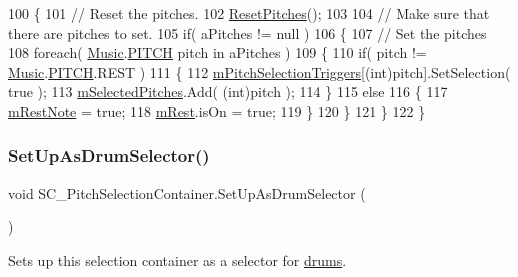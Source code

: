 \begin{DoxyCode}
100     \{
101         \textcolor{comment}{// Reset the pitches.}
102         \hyperlink{group___s_c___p_s_c_pub_func_ga678ef561c5418e4bf43a5f9ed753f0f0}{ResetPitches}();
103 
104         \textcolor{comment}{// Make sure that there are pitches to set.}
105         \textcolor{keywordflow}{if}( aPitches != null )
106         \{
107             \textcolor{comment}{// Set the pitches}
108             \textcolor{keywordflow}{foreach}( \hyperlink{class_music}{Music}.\hyperlink{group___music_enums_ga508f69b199ea518f935486c990edac1d}{PITCH} pitch in aPitches )
109             \{
110                 \textcolor{keywordflow}{if}( pitch != \hyperlink{class_music}{Music}.\hyperlink{group___music_enums_ga508f69b199ea518f935486c990edac1d}{PITCH}.REST )
111                 \{
112                     \hyperlink{group___s_c___p_s_c_priv_var_ga8431846d376b98bc6de5a872cce2c596}{mPitchSelectionTriggers}[(int)pitch].SetSelection( \textcolor{keyword}{true} );
113                     \hyperlink{group___s_c___p_s_c_priv_var_ga5a8a5c31158f6af7f0c17d4fd03c5641}{mSelectedPitches}.Add( (\textcolor{keywordtype}{int})pitch );
114                 \}
115                 \textcolor{keywordflow}{else}
116                 \{
117                     \hyperlink{group___s_c___p_s_c_priv_var_ga6eec175f775c35e2d0eb51dfe6def49f}{mRestNote} = \textcolor{keyword}{true};
118                     \hyperlink{group___s_c___p_s_c_priv_var_gae4378d4e0b53501eb0f55b8af38a5a8c}{mRest}.isOn = \textcolor{keyword}{true};
119                 \}
120             \}
121         \}
122     \}
\end{DoxyCode}
\mbox{\label{group___s_c___p_s_c_pub_func_ga08a0a4943359eb7f28c64aaf4cbc233c}} 
\subsubsection{\texorpdfstring{Set\+Up\+As\+Drum\+Selector()}{SetUpAsDrumSelector()}}
{\footnotesize\ttfamily void S\+C\+\_\+\+Pitch\+Selection\+Container.\+Set\+Up\+As\+Drum\+Selector (\begin{DoxyParamCaption}{ }\end{DoxyParamCaption})}



Sets up this selection container as a selector for \hyperlink{group___music_enums_gade475b4382c7066d1af13e7c13c029b6}{drums}. 

